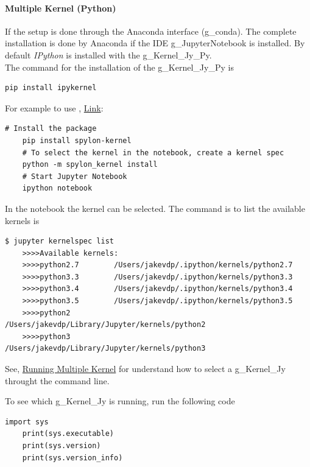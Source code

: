 \paragraph{Multiple Kernel (Python)}
If the setup is done through the Anaconda interface (\gls{g_conda}). The complete installation is done by Anaconda if the \gls{IDE} \gls{g_JupyterNotebook} is installed. By default \textit{IPython} is installed with the \gls{g_Kernel_Jy_Py}.\\

The command for the installation of the \gls{g_Kernel_Jy_Py} is
\begin{lstlisting}[language=iCMD, caption={pip to install ipykernel},captionpos=b]
	pip install ipykernel
\end{lstlisting}
For example to use , \href{https://community.databricks.com/t5/data-engineering/how-can-we-run-scala-in-a-jupyter-notebook/td-p/17752}{Link}:
\begin{lstlisting}[language=iCMD, caption={Using Scala for a Notebook},captionpos=b]
	# Install the package
	pip install spylon-kernel
	# To select the kernel in the notebook, create a kernel spec
	python -m spylon_kernel install
	# Start Jupyter Notebook
	ipython notebook
\end{lstlisting}
In the notebook the kernel can be selected. The command is to list the available kernels is
\begin{lstlisting}[language=iCMD, caption={pip to install ipykernel},captionpos=b]
	$ jupyter kernelspec list
	>>>>Available kernels:
	>>>>python2.7        /Users/jakevdp/.ipython/kernels/python2.7
	>>>>python3.3        /Users/jakevdp/.ipython/kernels/python3.3
	>>>>python3.4        /Users/jakevdp/.ipython/kernels/python3.4
	>>>>python3.5        /Users/jakevdp/.ipython/kernels/python3.5
	>>>>python2          /Users/jakevdp/Library/Jupyter/kernels/python2
	>>>>python3          /Users/jakevdp/Library/Jupyter/kernels/python3
\end{lstlisting}
See, \href{https://stackoverflow.com/questions/39007571/running-jupyter-with-multiple-python-and-ipython-paths}{Running Multiple Kernel} for understand how to select a \gls{g_Kernel_Jy} throught the command line.

To see which \gls{g_Kernel_Jy} is running, run the following code
\begin{lstlisting}[language=iPython]
	import sys
	print(sys.executable)
	print(sys.version)
	print(sys.version_info)
\end{lstlisting} 

